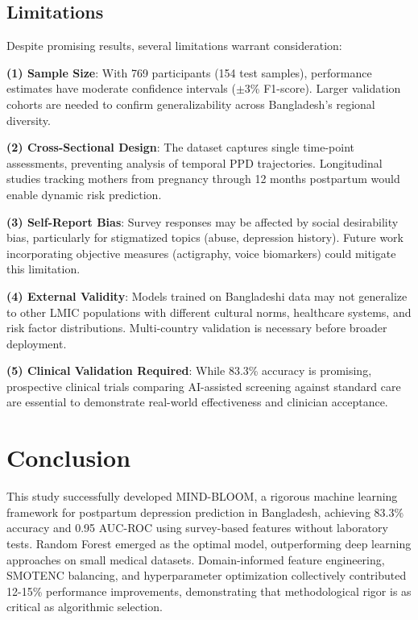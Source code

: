 \subsection{Limitations}

Despite promising results, several limitations warrant consideration:

\textbf{(1) Sample Size}: With 769 participants (154 test samples), performance estimates have moderate confidence intervals ($\pm$3\% F1-score). Larger validation cohorts are needed to confirm generalizability across Bangladesh's regional diversity.

\textbf{(2) Cross-Sectional Design}: The dataset captures single time-point assessments, preventing analysis of temporal PPD trajectories. Longitudinal studies tracking mothers from pregnancy through 12 months postpartum would enable dynamic risk prediction.

\textbf{(3) Self-Report Bias}: Survey responses may be affected by social desirability bias, particularly for stigmatized topics (abuse, depression history). Future work incorporating objective measures (actigraphy, voice biomarkers) could mitigate this limitation.

\textbf{(4) External Validity}: Models trained on Bangladeshi data may not generalize to other LMIC populations with different cultural norms, healthcare systems, and risk factor distributions. Multi-country validation is necessary before broader deployment.

\textbf{(5) Clinical Validation Required}: While 83.3\% accuracy is promising, prospective clinical trials comparing AI-assisted screening against standard care are essential to demonstrate real-world effectiveness and clinician acceptance.

\section{Conclusion}

This study successfully developed MIND-BLOOM, a rigorous machine learning framework for postpartum depression prediction in Bangladesh, achieving 83.3\% accuracy and 0.95 AUC-ROC using survey-based features without laboratory tests. Random Forest emerged as the optimal model, outperforming deep learning approaches on small medical datasets. Domain-informed feature engineering, SMOTENC balancing, and hyperparameter optimization collectively contributed 12-15\% performance improvements, demonstrating that methodological rigor is as critical as algorithmic selection.

